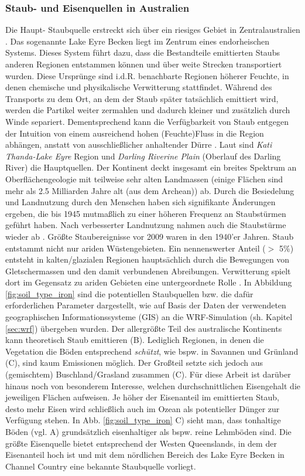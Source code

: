 \documentclass[12pt,a4paper,onecolumn]{scrartcl}
\begin{document}
\subsubsection{Staub- und Eisenquellen in Australien} \label{sec:staubquellen}
Die Haupt- Staubquelle erstreckt sich über ein riesiges Gebiet in Zentralaustralien \citep{Shao.2011}. Das sogenannte Lake Eyre Becken liegt im Zentrum eines endorheischen Systems. Dieses System führt dazu, dass die Bestandteile emittierten Staubs anderen Regionen entstammen können und über weite Strecken transportiert wurden. Diese Ursprünge sind i.d.R. benachbarte Regionen höherer Feuchte, in denen chemische und physikalische Verwitterung stattfindet. Während des Transports zu dem Ort, an dem der Staub später tatsächlich emittiert wird, werden die Partikel weiter zermahlen und dadurch kleiner und zusätzlich durch Winde separiert. Dementsprechend kann die Verfügbarkeit von Staub entgegen der Intuition von einem ausreichend hohen (Feuchte)Fluss in die Region abhängen, anstatt von ausschließlicher anhaltender Dürre \citep{Marx.2018}.
Laut \citet{Deckker.2019} sind \textit{Kati Thanda-Lake Eyre} Region und \textit{Darling Riverine Plain} (Oberlauf des Darling River) die Hauptquellen. Der Kontinent deckt insgesamt ein breites Spektrum an Oberflächengeologie mit teilweise sehr alten Landmassen (einige Flächen sind mehr als 2.5 Milliarden Jahre alt (aus dem Archean)) ab. Durch die Besiedelung und Landnutzung durch den Menschen haben sich signifikante Änderungen ergeben, die bis 1945 mutmaßlich zu einer höheren Frequenz an Staubstürmen geführt haben. Nach verbesserter Landnutzung nahmen auch die Staubstürme wieder ab \citep{Deckker.2019}. Größte Staubereignisse vor 2009 waren in den 1940'er Jahren. Staub entstammt nicht nur ariden Wüstengebieten. Ein nennenswerter Anteil ($>$ 5\%) entsteht in kalten/glazialen Regionen hauptsächlich durch die Bewegungen von Gletschermassen und den damit verbundenen Abreibungen. Verwitterung spielt dort im Gegensatz zu ariden Gebieten eine untergeordnete Rolle \citep{Marx.2018}. In Abbildung \ref{fig:soil_type_iron} sind die potentiellen Staubquellen bzw. die dafür erforderlichen Parameter dargestellt, wie auf Basis der Daten der verwendeten geographischen Informationssysteme (GIS) an die WRF-Simulation (sh. Kapitel \ref{sec:wrf}) übergeben wurden. Der allergrößte Teil des australische Kontinents kann theoretisch Staub emittieren (B). Lediglich Regionen, in denen die Vegetation die Böden entsprechend \textit{schützt}, wie bspw. in Savannen und Grünland (C), sind kaum Emissionen möglich. Der Großteil setzte sich jedoch aus (gemischtem) Buschland/Grasland zusammen (C). Für diese Arbeit ist darüber hinaus noch von besonderem Interesse, welchen durchschnittlichen Eisengehalt die jeweiligen Flächen aufweisen. Je höher der Eisenanteil im emittierten Staub, desto mehr Eisen wird schließlich auch im Ozean als potentieller Dünger zur Verfügung stehen. In Abb. \ref{fig:soil_type_iron} C) sieht man, dass tonhaltige Böden (vgl. A) grundsätzlich eisenhaltiger als bspw. reine Lehmböden sind. Die größte Eisenquelle bietet entsprechend der Westen Queenslands, in dem der Eisenanteil hoch ist und mit dem nördlichen Bereich des Lake Eyre Becken in Channel Country eine bekannte Staubquelle vorliegt.
\end{document}
